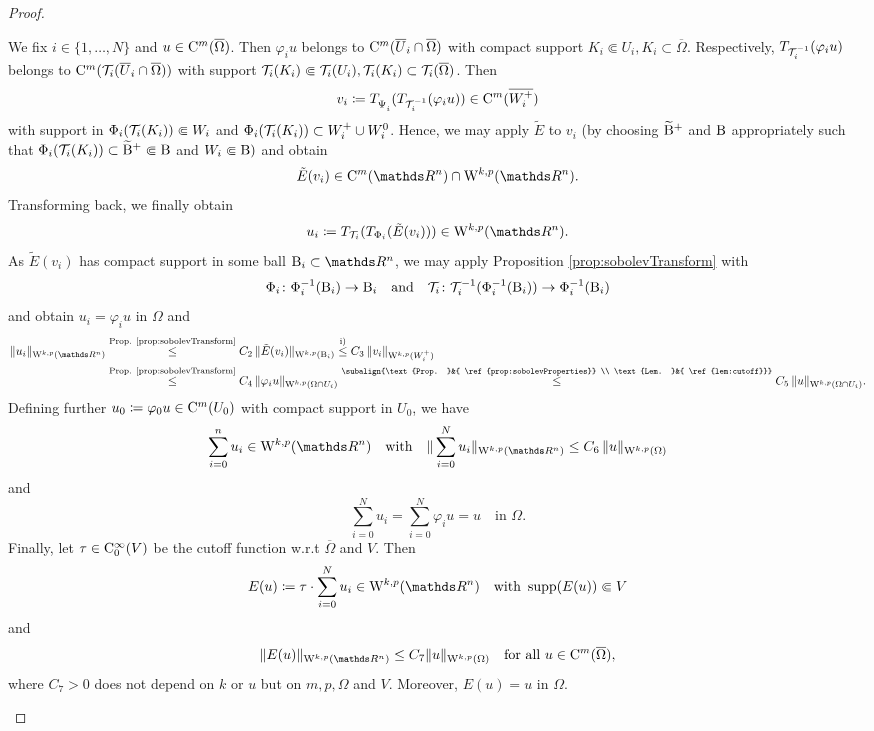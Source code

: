 \begin{proof}
\begin{enumerate}[i)]
      We fix $i \in \{1,\dots,N\}$ and $u \in \mathrm{C}^m(\overline\Omega)$.
      Then $\varphi_i u$  belongs to $\mathrm{C}^m(\overline U_i \cap \overline\Omega)$ with compact support $K_i \Subset U_i, K_i \subset \overline\Omega$. Respectively, $T_{\mathcal{T}_i^{-1}}(\varphi_i u)$ belongs to $\mathrm{C}^m(\mathcal{T}_i(\overline U_i \cap \overline\Omega))$ with support $\mathcal{T}_i(K_i) \Subset \mathcal{T}_i(U_i), \mathcal{T}_i(K_i) \subset \mathcal{T}_i(\overline\Omega)$.
      Then
      $$
      v_i \coloneqq T_{\vphantom{\Tau_i^{-1}}{\Psi_i^{\vphantom{-1}}}}(T_{\Tau_i^{-1}}(\varphi_i u)) \in \CC^m(\overline{W_i^+})
      $$
      with support in $\Phi_i(\mathcal{T}_i(K_i)) \Subset W_i$ and $\Phi_i(\mathcal{T}_i(K_i)) \subset W_i^+ \cup W_i^0$.
      Hence, we may apply $\tilde E$ to $v_i$ (by choosing $\widetilde {\mathrm{B}}^+$ and $\mathrm{B}$ appropriately such that $\Phi_i(\mathcal{T}_i(K_i)) \subset \widetilde {\mathrm{B}}^+ \Subset \mathrm{B}$ and $W_i \Subset \mathrm{B})$ and obtain
      $$
      \tilde E(v_i)  \in \CC^m(\R^n) \cap \WW^{k,p}(\R^n).
      $$
      Transforming back, we finally obtain
      $$
      u_i \coloneqq T_{\Tau_i} ( T_{\Phi_i}( \tilde E(v_i))) \in \WW^{k,p}(\R^n).
      $$
      As $\tilde E(v_i)$ has compact support in some ball $\BB_i \subset \R^n$, we may apply Proposition \ref{prop:sobolevTransform} with 
      $$
      \Phi_i \colon \Phi_i^{-1}(\mathrm{B}_i) \to \mathrm{B}_i \quad\text{and}\quad
      \mathcal{T}_i \colon \mathcal{T}_i^{-1}(\Phi_i^{-1}(\mathrm{B}_i)) \to \Phi_i^{-1}(\mathrm{B}_i)
      $$
      and obtain $u_i = \varphi_i u$ in $\Omega$ and 
      \begin{align*}
        \|u_i\|_{\WW^{k,p}(\R^n)}
        &\overset{\text{Prop. \ref{prop:sobolevTransform}}}{\leq} C_2 \, \| \tilde E(v_i) \|_{\WW^{k,p}(\BB_i)}
        \overset{\mathrm i)}{\leq} C_3 \, \| v_i \|_{\WW^{k,p}(W_i^+)} \\
        &\overset{\text{Prop. \ref{prop:sobolevTransform}}}{\leq} C_4 \, \|\varphi_i u\|_{\WW^{k,p}(\Omega \cap U_i)}  
        \overset{\subalign{\text{Prop. }&{ \ref{prop:sobolevProperties}} \\ \text{Lem. }&{ \ref{lem:cutoff}}}}{\leq} C_5 \, \|u\|_{\WW^{k,p}(\Omega \cap U_i)}.
      \end{align*}
      Defining further $u_0 \coloneqq \varphi_0 u \in \mathrm{C}^m(U_0)$ with compact support in $U_0$, we have 
      $$
        \sum_{i = 0}^n u_i \in \WW^{k,p}(\R^n) \quad\text{with}\quad \| \sum_{i = 0}^N u_i \|_{\WW^{k,p}(\R^n)} \leq C_6 \, \|u\|_{\WW^{k,p}(\Omega)} 
        $$
        and
        $$
        \sum_{i = 0}^N u_i = \sum_{i = 0}^N \varphi_i u = u \quad\text{in }\Omega.
        $$
        Finally, let $\tau \in \mathrm{C}_0^\infty(V)$ be the cutoff function w.r.t $\overline \Omega$ and $V$. Then
        $$
        E(u) \coloneqq \tau \cdot \sum_{i = 0}^N u_i \in \WW^{k,p}(\R^n) \quad\text{with } \supp (E(u)) \Subset V
        $$
        and
        \begin{equation}
          \label{eq:continuousExtension}
          \|E(u)\|_{\WW^{k,p}(\R^n)} \leq C_7 \|u \|_{\WW^{k,p}(\Omega)} \quad\text{for all } u \in \CC^m(\overline\Omega),
        \end{equation}
        where $C_7 > 0$ does not depend on $k$ or $u$ but on $m,p,\Omega$ and $V$.
        Moreover, $E(u) = u$ in $\Omega$.


\end{enumerate}
\end{proof}
